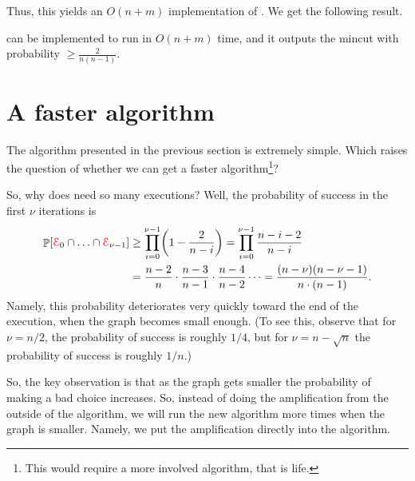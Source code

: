 Thus, this yields an $O(n + m)$ implementation of \MinCut{}. We get the
following result.

\begin{lemma}
    \MinCut{} can be implemented to run in $O(n + m)$ time, and it
    outputs the mincut with probability
    $\displaystyle \geq \frac{2}{n ( n-1 ) }$.
\end{lemma}



\section{A faster algorithm}

The algorithm presented in the previous section is extremely simple.
Which raises the question of whether we can get a faster
algorithm\footnote{This would require a more involved algorithm, that
   is life.}?

So, why does \MinCutRep{} need so many executions? Well, the probability
of success in the first $\nu$ iterations is
\begin{align}
  \Prob{\Event_{0}\cap\ldots\cap\Event_{\nu-1}}
  &\geq 
    \prod_{i=0}^{\nu-1}\pth{1-\frac{2}{n-i}}
    =  \prod_{i=0}^{\nu-1}\frac{n-i-2}{n-i} \nonumber\\
  &=  \frac{n-2}{n}\cdot \frac{n-3}{n-1}\cdot \frac{n-4}{n-2}\cdots =
    \frac{(n-\nu)(n-\nu-1)}{n\cdot(n-1)}.  \eqlab{first}
\end{align}
Namely, this probability deteriorates very quickly toward the end of
the execution, when the graph becomes small enough. (To see this,
observe that for $\nu=n/2$, the probability of success is roughly
$1/4$, but for $\nu=n-\sqrt{n}$ the probability of success is roughly
$1/n$.)


So, the key observation is that as the graph gets smaller the
probability of making a bad choice increases.  So, instead of doing the
amplification from the outside of the algorithm, we will run the new
algorithm more times when the graph is smaller. Namely, we put the
amplification directly into the algorithm.


